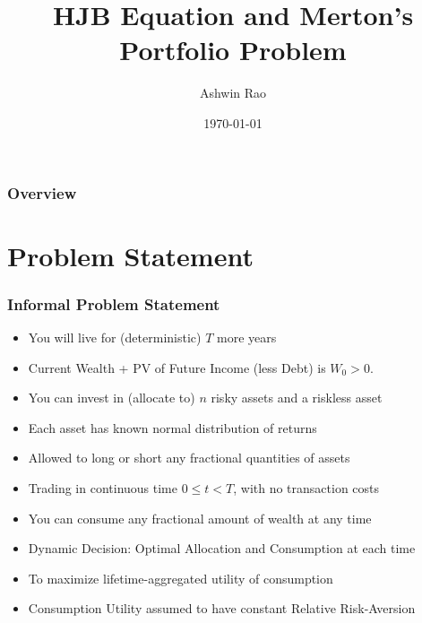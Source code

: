 \documentclass{beamer}
\title[HJB and Merton Portfolio]{HJB Equation and Merton's Portfolio Problem} %
\author{Ashwin Rao} %
\institute[Stanford] %
{
ICME, Stanford University
}
\date{\today} %
\begin{document}
\begin{frame}
\titlepage %
\end{frame}

\begin{frame}
\frametitle{Overview} %
\tableofcontents %
\end{frame}

\section{Problem Statement}

\begin{frame}
\frametitle{Informal Problem Statement}
\begin{itemize}
\item You will live for (deterministic) $T$ more years
\item Current Wealth + PV of Future Income (less Debt) is $W_0 > 0$.
\item You can invest in (allocate to) $n$ risky assets and a riskless asset
\item Each asset has known normal distribution of returns
\item Allowed to long or short any fractional quantities of assets
\item Trading in continuous time $0 \leq t < T$, with no transaction costs
\item You can consume any fractional amount of wealth at any time
\item Dynamic Decision: Optimal Allocation and Consumption at each time
\item To maximize lifetime-aggregated utility of consumption
\item Consumption Utility assumed to have constant Relative Risk-Aversion
\end{itemize}
\end{frame}
\end{document}
